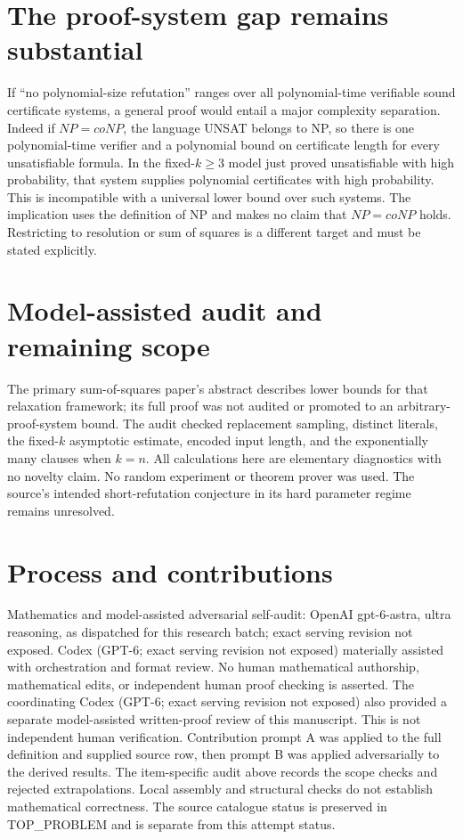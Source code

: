 \documentclass[11pt]{article}
\begin{document}
\section{The proof-system gap remains substantial}
If ``no polynomial-size refutation'' ranges over all polynomial-time
verifiable sound certificate systems, a general proof would entail a
major complexity separation. Indeed if $NP=coNP$, the language UNSAT
belongs to NP, so there is one polynomial-time verifier and a polynomial
bound on certificate length for every unsatisfiable formula. In the
fixed-$k\ge3$ model just proved unsatisfiable with high probability,
that system supplies polynomial certificates with high probability.
This is incompatible with a universal lower bound over such systems.
The implication uses the definition of NP and makes no claim that
$NP=coNP$ holds. Restricting to resolution or sum of squares is a
different target and must be stated explicitly.

\section{Model-assisted audit and remaining scope}
The primary sum-of-squares paper's abstract describes lower bounds for
that relaxation framework; its full proof was not audited or promoted
to an arbitrary-proof-system bound. The audit checked replacement
sampling, distinct literals, the fixed-$k$ asymptotic estimate, encoded
input length, and the exponentially many clauses when $k=n$.
All calculations here are elementary diagnostics with no novelty claim.
No random experiment or theorem prover was used. The source's intended
short-refutation conjecture in its hard parameter regime remains unresolved.

\section{Process and contributions}
Mathematics and model-assisted adversarial self-audit: OpenAI gpt-6-astra, ultra reasoning, as dispatched for this research batch; exact serving revision not exposed. Codex (GPT-6; exact serving revision not exposed) materially assisted with orchestration and format review. No human mathematical authorship, mathematical edits, or independent human proof checking is asserted.
The coordinating Codex (GPT-6; exact serving revision not exposed) also provided a separate model-assisted written-proof review of this manuscript. This is not independent human verification.
Contribution prompt A was applied to the full definition and supplied source row, then prompt B was applied adversarially to the derived results. The item-specific audit above records the scope checks and rejected extrapolations. Local assembly and structural checks do not establish mathematical correctness. The source catalogue status is preserved in TOP\_PROBLEM and is separate from this attempt status.
\end{document}

